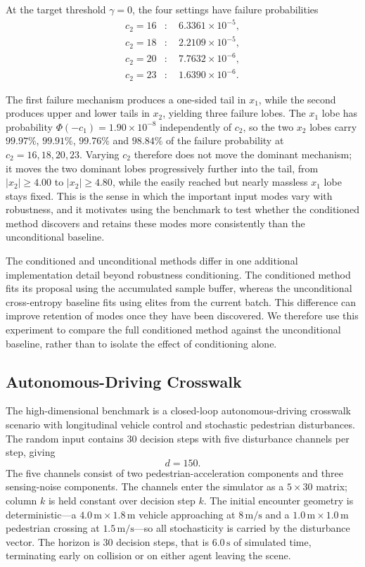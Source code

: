 At the target threshold $\gamma=0$, the four settings have failure probabilities
\[
\begin{aligned}
    c_2=16 &: \quad 6.3361\times10^{-5},\\
    c_2=18 &: \quad 2.2109\times10^{-5},\\
    c_2=20 &: \quad 7.7632\times10^{-6},\\
    c_2=23 &: \quad 1.6390\times10^{-6}.
\end{aligned}
\]

The first failure mechanism produces a one-sided tail in $x_1$, while the second produces upper and lower tails in $x_2$, yielding three failure lobes. The $x_1$ lobe has probability $\Phi(-c_1)=1.90\times10^{-8}$ independently of $c_2$, so the two $x_2$ lobes carry $99.97\%$, $99.91\%$, $99.76\%$ and $98.84\%$ of the failure probability at $c_2=16,18,20,23$. Varying $c_2$ therefore does not move the dominant mechanism; it moves the two dominant lobes progressively further into the tail, from $|x_2|\geq 4.00$ to $|x_2|\geq 4.80$, while the easily reached but nearly massless $x_1$ lobe stays fixed. This is the sense in which the important input modes vary with robustness, and it motivates using the benchmark to test whether the conditioned method discovers and retains these modes more consistently than the unconditional baseline.

The conditioned and unconditional methods differ in one additional implementation detail beyond robustness conditioning. The conditioned method fits its proposal using the accumulated sample buffer, whereas the unconditional cross-entropy baseline fits using elites from the current batch. This difference can improve retention of modes once they have been discovered. We therefore use this experiment to compare the full conditioned method against the unconditional baseline, rather than to isolate the effect of conditioning alone.

\subsection{Autonomous-Driving Crosswalk}
\label{app:idm}

The high-dimensional benchmark is a closed-loop autonomous-driving crosswalk scenario with longitudinal vehicle control and stochastic pedestrian disturbances. The random input contains 30 decision steps with five disturbance channels per step, giving
\[
    d=150.
\]
The five channels consist of two pedestrian-acceleration components and three sensing-noise components. The channels enter the simulator as a $5\times30$ matrix; column $k$ is held constant over decision step $k$. The initial encounter geometry is deterministic---a $4.0\,\mathrm{m}\times1.8\,\mathrm{m}$ vehicle approaching at $8\,\mathrm{m/s}$ and a $1.0\,\mathrm{m}\times1.0\,\mathrm{m}$ pedestrian crossing at $1.5\,\mathrm{m/s}$---so all stochasticity is carried by the disturbance vector. The horizon is $30$ decision steps, that is $6.0\,\mathrm{s}$ of simulated time, terminating early on collision or on either agent leaving the scene.

